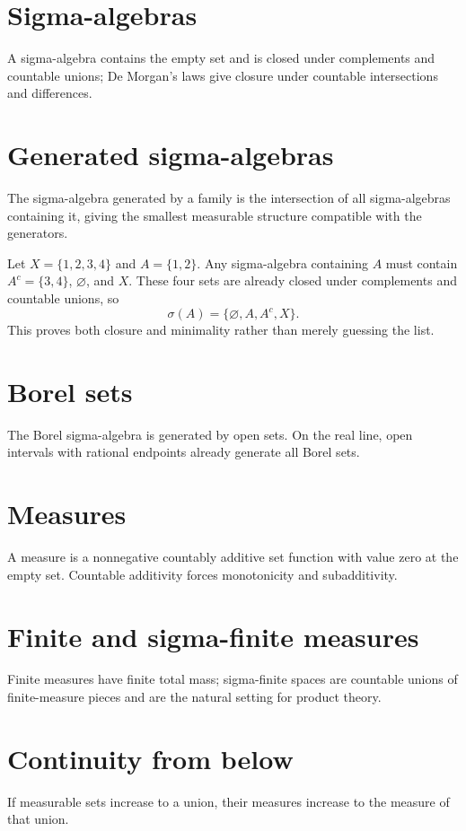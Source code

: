 \section{Sigma-algebras}
A sigma-algebra contains the empty set and is closed under complements and countable unions; De Morgan's laws give closure under countable intersections and differences.

\section{Generated sigma-algebras}
The sigma-algebra generated by a family is the intersection of all sigma-algebras containing it, giving the smallest measurable structure compatible with the generators.


\begin{example}\label{ex:iii01-expand-01}
Let \(X=\{1,2,3,4\}\) and \(A=\{1,2\}\). Any sigma-algebra containing
\(A\) must contain \(A^c=\{3,4\}\), \(\varnothing\), and \(X\). These four
sets are already closed under complements and countable unions, so
\[
\sigma(A)=\{\varnothing,A,A^c,X\}.
\]
This proves both closure and minimality rather than merely guessing the list.
\end{example}
\section{Borel sets}
The Borel sigma-algebra is generated by open sets. On the real line, open intervals with rational endpoints already generate all Borel sets.

\section{Measures}
A measure is a nonnegative countably additive set function with value zero at the empty set. Countable additivity forces monotonicity and subadditivity.

\section{Finite and sigma-finite measures}
Finite measures have finite total mass; sigma-finite spaces are countable unions of finite-measure pieces and are the natural setting for product theory.

\section{Continuity from below}
If measurable sets increase to a union, their measures increase to the measure of that union.

